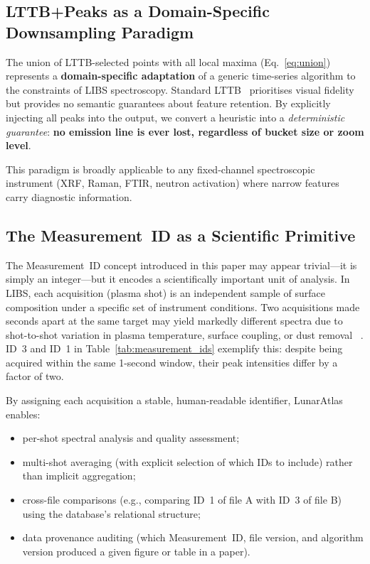 \documentclass[a4paper,twocolumn,10pt]{article}
\begin{document}
\subsection{LTTB+Peaks as a Domain-Specific Downsampling Paradigm}

The union of LTTB-selected points with all local maxima
(Eq.~\ref{eq:union}) represents a \textbf{domain-specific adaptation}
of a generic time-series algorithm to the constraints of LIBS
spectroscopy.  Standard LTTB~\cite{Steinarsson2013} prioritises
visual fidelity but provides no semantic guarantees about feature
retention.  By explicitly injecting all peaks into the output, we
convert a heuristic into a \emph{deterministic guarantee}:
\textbf{no emission line is ever lost, regardless of bucket size or
zoom level}.

This paradigm is broadly applicable to any fixed-channel spectroscopic
instrument (XRF, Raman, FTIR, neutron activation) where narrow features
carry diagnostic information.

\subsection{The Measurement~ID as a Scientific Primitive}

The Measurement~ID concept introduced in this paper may appear
trivial---it is simply an integer---but it encodes a scientifically
important unit of analysis.  In LIBS, each acquisition (plasma shot)
is an independent sample of surface composition under a specific set
of instrument conditions.  Two acquisitions made seconds apart at the
same target may yield markedly different spectra due to shot-to-shot
variation in plasma temperature, surface coupling, or dust removal
~\cite{Wiens2012}.  ID~3 and ID~1 in Table~\ref{tab:measurement_ids}
exemplify this: despite being acquired within the same 1-second window,
their peak intensities differ by a factor of two.

By assigning each acquisition a stable, human-readable identifier,
LunarAtlas enables:
\begin{itemize}[nosep,leftmargin=*]
  \item per-shot spectral analysis and quality assessment;
  \item multi-shot averaging (with explicit selection of which IDs to
    include) rather than implicit aggregation;
  \item cross-file comparisons (e.g., comparing ID~1 of file A with
    ID~3 of file B) using the database's relational structure;
  \item data provenance auditing (which Measurement~ID, file version,
    and algorithm version produced a given figure or table in a paper).
\end{itemize}
\end{document}
